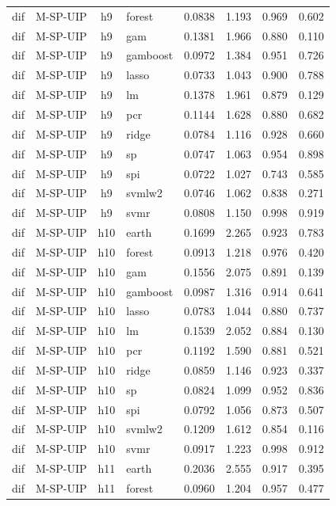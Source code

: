 \begin{ThreePartTable}
\begin{longtable}[t]{llclcccc}
dif & M-SP-UIP & h9 & forest & 0.0838 & 1.193 & 0.969 & 0.602\\
dif & M-SP-UIP & h9 & gam & 0.1381 & 1.966 & 0.880 & 0.110\\
dif & M-SP-UIP & h9 & gamboost & 0.0972 & 1.384 & 0.951 & 0.726\\
dif & M-SP-UIP & h9 & lasso & 0.0733 & 1.043 & 0.900 & 0.788\\
dif & M-SP-UIP & h9 & lm & 0.1378 & 1.961 & 0.879 & 0.129\\
dif & M-SP-UIP & h9 & pcr & 0.1144 & 1.628 & 0.880 & 0.682\\
dif & M-SP-UIP & h9 & ridge & 0.0784 & 1.116 & 0.928 & 0.660\\
dif & M-SP-UIP & h9 & sp & 0.0747 & 1.063 & 0.954 & 0.898\\
dif & M-SP-UIP & h9 & spi & 0.0722 & 1.027 & 0.743 & 0.585\\
dif & M-SP-UIP & h9 & svmlw2 & 0.0746 & 1.062 & 0.838 & 0.271\\
dif & M-SP-UIP & h9 & svmr & 0.0808 & 1.150 & 0.998 & 0.919\\
\addlinespace
dif & M-SP-UIP & h10 & earth & 0.1699 & 2.265 & 0.923 & 0.783\\
dif & M-SP-UIP & h10 & forest & 0.0913 & 1.218 & 0.976 & 0.420\\
dif & M-SP-UIP & h10 & gam & 0.1556 & 2.075 & 0.891 & 0.139\\
dif & M-SP-UIP & h10 & gamboost & 0.0987 & 1.316 & 0.914 & 0.641\\
dif & M-SP-UIP & h10 & lasso & 0.0783 & 1.044 & 0.880 & 0.737\\
dif & M-SP-UIP & h10 & lm & 0.1539 & 2.052 & 0.884 & 0.130\\
dif & M-SP-UIP & h10 & pcr & 0.1192 & 1.590 & 0.881 & 0.521\\
dif & M-SP-UIP & h10 & ridge & 0.0859 & 1.146 & 0.923 & 0.337\\
dif & M-SP-UIP & h10 & sp & 0.0824 & 1.099 & 0.952 & 0.836\\
dif & M-SP-UIP & h10 & spi & 0.0792 & 1.056 & 0.873 & 0.507\\
dif & M-SP-UIP & h10 & svmlw2 & 0.1209 & 1.612 & 0.854 & 0.116\\
dif & M-SP-UIP & h10 & svmr & 0.0917 & 1.223 & 0.998 & 0.912\\
\addlinespace
dif & M-SP-UIP & h11 & earth & 0.2036 & 2.555 & 0.917 & 0.395\\
dif & M-SP-UIP & h11 & forest & 0.0960 & 1.204 & 0.957 & 0.477\\

\end{longtable}
\end{ThreePartTable}
